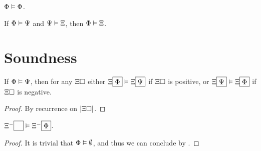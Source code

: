 \begin{fact}[Reflexivity]
  $\Phi \vDash \Phi$.
\end{fact}

\begin{fact}[Transitivity]
  If $\Phi \vDash \Psi$ and $\Psi \vDash \Xi$, then $\Phi \vDash \Xi$.
\end{fact}


\section{Soundness}

\begin{lemma}[Functoriality] If $\Phi \vDash
  \Psi$, then for any $\Xi\square$ either $\Xi\fbox{$\Phi$} \vDash
  \Xi\fbox{$\Psi$}$ if $\Xi\square$ is positive, or $\Xi\fbox{$\Psi$} \vDash
  \Xi\fbox{$\Phi$}$ if $\Xi\square$ is negative.
\end{lemma}
\begin{proof}
  By recurrence on $\left|\Xi\square\right|$.
\end{proof}

\begin{lemma}[Weakening]
  $\Xi^-\fbox{$\phantom{\Phi}$} \vDash \Xi^-\fbox{$\Phi$}$.
\end{lemma}
\begin{proof}
  It is trivial that $\Phi \vDash \emptyset$, and thus we can conclude by
  .
\end{proof}

